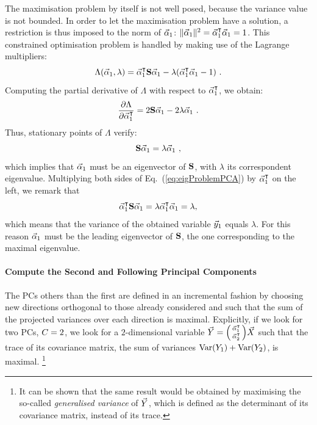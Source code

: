 The maximisation problem by itself is not well posed, because the variance value is not bounded. In order to let the maximisation problem have a solution, a restriction is thus imposed to the norm of $\vec{\alpha}_1$: $\|\vec{\alpha}_1\|^2=\vec{\alpha}_1^\intercal\vec{\alpha}_1 = 1$. 
This constrained  optimisation problem is handled by making use of the Lagrange multipliers:
\begin{equation}
\Lambda(\vec{\alpha}_1, \lambda) = \vec{\alpha}_1^\intercal\textbf{S}\vec{\alpha}_1 - \lambda(\vec{\alpha}_1^\intercal\vec{\alpha}_1-1) \mbox{ .}
\end{equation}
Computing the partial derivative of $\Lambda$ with respect to $\vec{\alpha}_1^\intercal$, we obtain:
\begin{equation}
\frac{\partial\Lambda}{\partial\vec{\alpha}_1^\intercal} = 2\textbf{S}\vec{\alpha}_1-2\lambda\vec{\alpha}_1 \mbox{ .}
\end{equation}
Thus, stationary points of $\Lambda$ verify:
\begin{equation}\label{eq:eigProblemPCA}
\textbf{S}\vec{\alpha}_1 = \lambda\vec{\alpha}_1 \mbox{ ,}
\end{equation}
which implies that $\vec{\alpha}_1$ must be an eigenvector of $\textbf{S}$, with $\lambda$ its correspondent eigenvalue. Multiplying both sides of Eq.~(\ref{eq:eigProblemPCA}) by $\vec{\alpha}_1^\intercal$ on the left, we remark that
\begin{equation}
\vec{\alpha}_1^\intercal\textbf{S}\vec{\alpha}_1 = \lambda\vec{\alpha}_1^\intercal\vec{\alpha}_1 = \lambda, 
\end{equation}
which means that the variance of the obtained variable $\vec{y}_1$ equals $\lambda$. For this reason $\vec{\alpha}_1$ must be the leading eigenvector of $\textbf{S}$, the one corresponding to the maximal eigenvalue.

\paragraph*{Compute the Second and Following Principal Components}
The PCs others than the first are defined in an incremental fashion by choosing new directions orthogonal to those already considered and such that the sum of the projected variances over each direction is maximal. Explicitly, if we look for two PCs, \ie $C = 2$,  we look for a $2$-dimensional variable $\vec{Y} = \begin{psmallmatrix} \vec{\alpha}_1^\intercal \\ \vec{\alpha}_2^\intercal \end{psmallmatrix} \vec{X}$ such that the trace of its covariance matrix, \ie the sum of variances $\mathrm{Var}(Y_1)+\mathrm{Var}(Y_2)$, is maximal. \footnote{It can be shown that the same result would be obtained by maximising the so-called \emph{generalised variance} of $\vec{Y}$, which is defined as the determinant of its covariance matrix, instead of its trace.}\\

